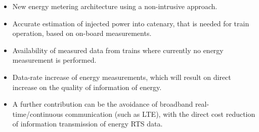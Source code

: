 \begin{itemize}
	\setlength\itemsep{0em}
	
	\item New energy metering architecture using a non-intrusive approach.
	
	\item Accurate estimation of injected power into catenary, that is needed for train operation, based on on-board measurements.
	
	\item Availability of measured data from trains where currently no energy measurement is performed.
	
	\item Data-rate increase of energy measurements, which will result on direct increase on the quality of information of energy.
	
	\item A further contribution can be the avoidance of broadband real-time/continuous communication (such as LTE), with the direct cost reduction of information transmission of energy RTS data.
	
	
\end{itemize}





